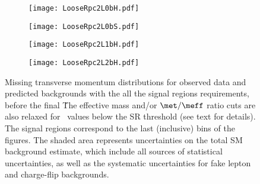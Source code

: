 \begin{figure}[p!]
\centering
 \begin{subfigure}{0.42\textwidth}
 \texttt{[image: LooseRpc2L0bH.pdf]}
 \end{subfigure}
 \begin{subfigure}{0.42\textwidth}
 \texttt{[image: LooseRpc2L0bS.pdf]}
 \end{subfigure}
  \begin{subfigure}{0.42\textwidth}
 \texttt{[image: LooseRpc2L1bH.pdf]}
 \end{subfigure}
  \begin{subfigure}{0.42\textwidth}
 \texttt{[image: LooseRpc2L2bH.pdf]}
 \end{subfigure}
   \caption{
Missing transverse momentum distributions for observed data and predicted backgrounds 
with the all the signal regions requirements, before the final \met\. 
The effective mass and/or $\met/\meff$ ratio cuts are also relaxed for \met\ values below the SR threshold (see text for details). 
The signal regions correspond to the last (inclusive) bins of the figures. 
The shaded area represents uncertainties on the total SM background estimate, 
which include all sources of statistical uncertainties, 
as well as the systematic uncertainties for fake lepton and charge-flip backgrounds. 
}
\label{fig:results_datamc_rpc}
\end{figure}


